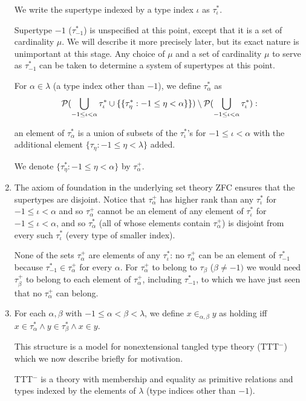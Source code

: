 \documentclass[12pt]{article}
\begin{document}
\begin{enumerate}
We write the supertype indexed by a type index $\iota$ as $\tau^*_\iota$.

Supertype $-1$ ($\tau^*_{-1}$) is unspecified at this point, except that it is a set of cardinality $\mu$.  We will describe it more precisely later, but its exact nature is unimportant at this stage.  Any choice of $\mu$ and a set of cardinality $\mu$ to serve as $\tau^*_{-1}$ can be taken to determine a system of supertypes at this point.

For $\alpha\in \lambda$ (a type index other than $-1$), we define $\tau^*_\alpha$ as $${\cal P} (\bigcup_{-1 \leq \iota<\alpha} \tau^*_\iota \cup \{\{\tau^*_\eta:-1\leq \eta <\alpha\}\}) \setminus {\cal P} (\bigcup_{-1 \leq \iota<\alpha}\tau^*_\iota):$$

an element of $\tau^*_\alpha$ is a union of subsets of the $\tau^*_\iota$'s for $-1\leq \iota <\alpha$ with the additional element $\{\tau_\eta:-1\leq \eta <\lambda\}$ added.

We denote $\{\tau^*_\eta:-1\leq \eta <\alpha\}$ by $\tau^+_{\alpha}$.

\item The axiom of foundation in the underlying set theory ZFC ensures that the supertypes are disjoint.  Notice that $\tau^+_{\alpha}$ has higher rank than any $\tau^*_\iota$ for
$-1\leq \iota <\alpha$ and so $\tau^+_{\alpha}$ cannot be an element of any element of $\tau^*_\iota$ for $-1\leq \iota<\alpha$, and so $\tau^*_\alpha$ (all of whose elements contain $\tau^+_{\alpha}$)  is disjoint from every
such $\tau^*_\iota$ (every type of smaller index).

None of the sets $\tau^+_{\alpha}$ are elements of any $\tau^*_\iota$:  no  $\tau^+_{\alpha}$ can be an element of $\tau^*_{-1}$ because $\tau^*_{-1} \in \tau^+_{\alpha}$ for every
$\alpha$.  For $\tau^+_{\alpha}$ to belong to $\tau_\beta$ ($\beta \neq -1)$ we would need $\tau^+_{\beta}$ to belong to each element of $\tau^+_\alpha$, including
$\tau^*_{-1}$, to which we have just seen that no $\tau^+_{\alpha}$ can belong.

\item For each $\alpha,\beta$ with $-1\leq\alpha<\beta<\lambda$, we define $x \in_{\alpha,\beta} y$ as holding iff $x \in \tau^*_\alpha \wedge y \in \tau^*_\beta \wedge x \in y$.

This structure is a model for nonextensional tangled type theory (TTT$^-$) which we now describe briefly for motivation.

TTT$^-$ is a theory with membership and equality as primitive relations and types indexed by the elements of $\lambda$ (type indices other than $-1$).


\end{enumerate}
\end{document}
